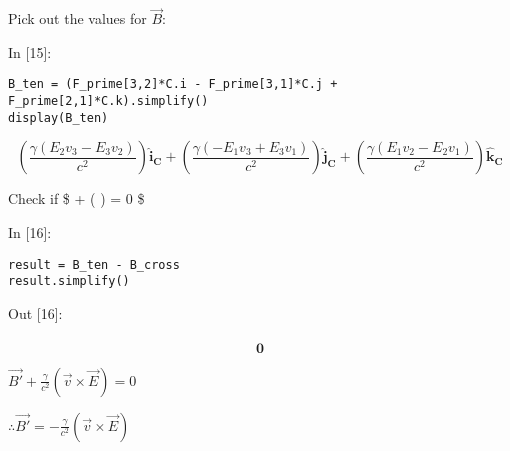 \documentclass[11pt]{article}
\newif\ifcode
\newif\ifleftmargins
\newlength{\promptlength}
\newcommand{\prompt}[3]{
        \needspace{1.1cm}
        \settowidth{\promptlength}{ #1 [#3] }
        \ifleftmargins\hspace{-\promptlength}\hspace{-5pt}\fi
        {\color{#2}#1 [#3]:}
        \ifleftmargins\vspace{-2.7ex}\fi
    }
\begin{document}
    
    Pick out the values for \(\vec{B}\):

    
\prompt{In}{incolor}{15}
\codetrue
\begin{tcolorbox}[breakable, size=fbox, boxrule=1pt, pad at break*=1mm, colback=cellbackground, colframe=cellborder]
\begin{verbatim}
B_ten = (F_prime[3,2]*C.i - F_prime[3,1]*C.j + F_prime[2,1]*C.k).simplify()
display(B_ten)
\end{verbatim}
\end{tcolorbox}
\codefalse

    $$(\frac{\gamma \left(E_{2} v_{3} - E_{3} v_{2}\right)}{c^{2}})\mathbf{\hat{i}_{C}} + (\frac{\gamma \left(- E_{1} v_{3} + E_{3} v_{1}\right)}{c^{2}})\mathbf{\hat{j}_{C}} + (\frac{\gamma \left(E_{1} v_{2} - E_{2} v_{1}\right)}{c^{2}})\mathbf{\hat{k}_{C}}$$

    
    Check if \$ +  ( \times {}) = 0 \$

    
\prompt{In}{incolor}{16}
\codetrue
\begin{tcolorbox}[breakable, size=fbox, boxrule=1pt, pad at break*=1mm, colback=cellbackground, colframe=cellborder]
\begin{verbatim}
result = B_ten - B_cross 
result.simplify()
\end{verbatim}
\end{tcolorbox}
\codefalse
 
            
\prompt{Out}{outcolor}{16}
    
    $$\mathbf{\hat{0}}$$

    

    \(\vec{B'} + \frac{\gamma}{c^2} (\vec{v} \times \vec{E}) = 0\)

\(\therefore \vec{B'} = -\frac{\gamma}{c^2} (\vec{v} \times \vec{E})\)


    
    
    
    
\end{document}
